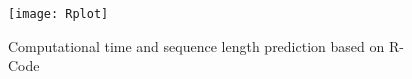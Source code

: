 \documentclass[DIV=13,fontsize=11pt]{scrartcl}
\begin{document}
\begin{figure}[h]
    \centering
    \texttt{[image: Rplot]}
    \caption{Computational time and sequence length prediction based on R-Code}
    \label{fig:mesh1}
\end{figure}







\end{document}
